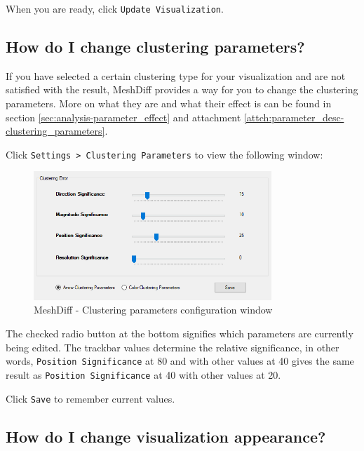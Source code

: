 When you are ready, click \verb+Update Visualization+.

\subsection{How do I change clustering parameters?}
\label{attch:user_doc-clustering_params}

If you have selected a certain clustering type for your visualization and are not satisfied with the result, MeshDiff provides a way for you to change the clustering parameters. More on what they are and what their effect is can be found in section \ref{sec:analysis-parameter_effect} and attachment \ref{attch:parameter_desc-clustering_parameters}.

Click \verb+Settings > Clustering Parameters+ to view the following window:

\begin{figure}[h]
	\centering
	\includegraphics[width=0.8\textwidth]{./img/meshdiff-clustering_parameters.PNG}
	\caption[MeshDiff - Clustering parameters]{MeshDiff - Clustering parameters configuration window}
	\label{fig:meshdiff-clustering_parameters_window}
\end{figure}

The checked radio button at the bottom signifies which parameters are currently being edited. The trackbar values determine the relative significance, in other words, \verb+Position Significance+ at 80 and with other values at 40 gives the same result as \verb+Position Significance+ at 40 with other values at 20.

Click \verb+Save+ to remember current values.

\subsection{How do I change visualization appearance?}
\label{attch:user_doc_vis_params}

